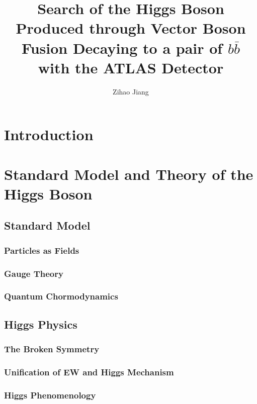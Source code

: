 \documentclass{report}
\begin{document}
\title{ Search of the Higgs Boson Produced through Vector Boson Fusion Decaying to a pair of $b \bar{b}$ with the ATLAS Detector}
\author{Zihao Jiang}

\beforepreface
{}




\afterpreface

\chapter{Introduction}
\label{chap:intro}


\chapter{Standard Model and Theory of the Higgs Boson}
\label{chap:theory}
\section{Standard Model}
\subsection{Particles as Fields}
\subsection{Gauge Theory}
\subsection{Quantum Chormodynamics}

\section{Higgs Physics}

\subsection{The Broken Symmetry}
\subsection{Unification of EW and Higgs Mechanism}
\subsection{Higgs Phenomenology}
\end{document}
